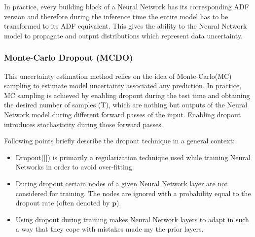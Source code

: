 	In practice, every building block of a Neural Network has its corresponding ADF version and therefore during the inference time the entire model has to be transformed to its ADF equivalent. This gives the ability to the Neural Network model to propagate and output distributions which represent data uncertainty.
	

	\subsubsection{Monte-Carlo Dropout (MCDO)}
	
	This uncertainty estimation method relies on the idea of Monte-Carlo(MC) sampling to estimate model uncertainty associated any prediction. In practice, MC sampling is achieved by enabling dropout during the test time and obtaining the desired number of samples (T), which are nothing but outputs of the Neural Network model during different forward passes of the input. Enabling dropout introduces stochasticity during those forward passes.
	
	Following points briefly describe the dropout technique in a general context:
	\begin{itemize}
		\item Dropout([]) is primarily a regularization technique used while training Neural Networks in order to avoid over-fitting.
		\item During dropout certain nodes of a given Neural Network layer are not considered for training. The nodes are ignored with a probability equal to the dropout rate (often denoted by $\textbf{p}$).
		\item Using dropout during training makes Neural Network layers to adapt in such a way that they cope with mistakes made my the prior layers. 
		
	\end{itemize}
	 

